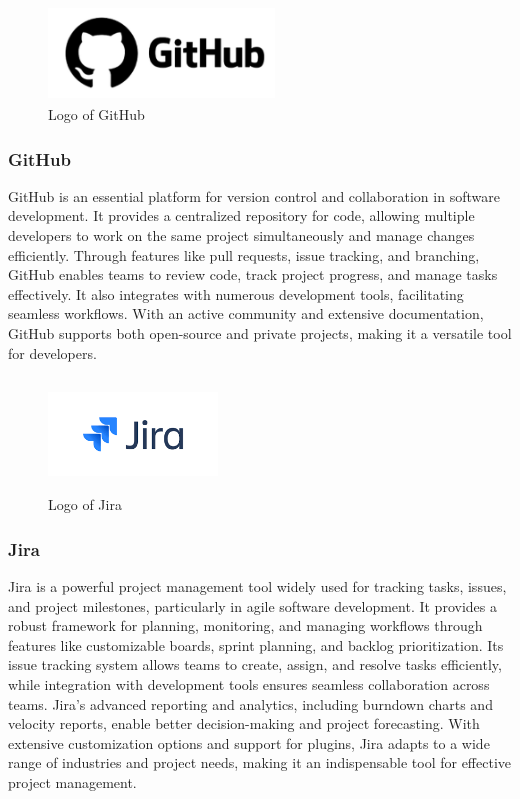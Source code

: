         \begin{figure}[htbp]
            \centerline{\includegraphics[width=6cm, height=2.5cm]{Images/logo/github.png}}
            \caption{Logo of GitHub}
            \label{fig}
        \end{figure}
        \subsubsection{GitHub}
            GitHub is an essential platform for version control and collaboration in software development. It provides a centralized repository for code, allowing multiple developers to work on the same project simultaneously and manage changes efficiently. Through features like pull requests, issue tracking, and branching, GitHub enables teams to review code, track project progress, and manage tasks effectively. It also integrates with numerous development tools, facilitating seamless workflows. With an active community and extensive documentation, GitHub supports both open-source and private projects, making it a versatile tool for developers.

        \begin{figure}[htbp]
            \centerline{\includegraphics[width=4.5cm, height=3cm]{Images/logo/jira.png}}
            \caption{Logo of Jira}
            \label{fig}
        \end{figure}
        \subsubsection{Jira}
Jira is a powerful project management tool widely used for tracking tasks, issues, and project milestones, particularly in agile software development. It provides a robust framework for planning, monitoring, and managing workflows through features like customizable boards, sprint planning, and backlog prioritization. Its issue tracking system allows teams to create, assign, and resolve tasks efficiently, while integration with development tools ensures seamless collaboration across teams. Jira's advanced reporting and analytics, including burndown charts and velocity reports, enable better decision-making and project forecasting. With extensive customization options and support for plugins, Jira adapts to a wide range of industries and project needs, making it an indispensable tool for effective project management.


